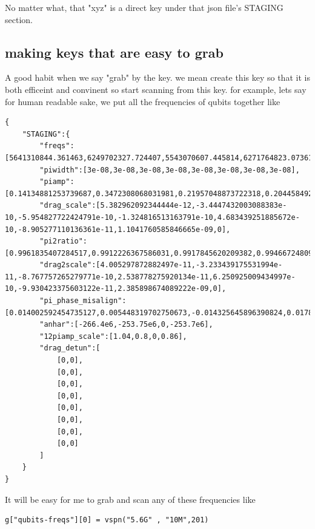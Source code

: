 \documentclass{article}
\begin{document}
No matter what, that "xyz" is a direct key under that json file's STAGING section.

\subsection{making keys that are easy to grab}
A good habit when we say "grab" by the key. we mean create this key so that it is both efficeint and convinent so start scanning from this key.
for example, lets say for human readable sake, we put all the frequencies of qubits together like

\begin{lstlisting}
{
	"STAGING":{
		"freqs":[5641310844.361463,6249702327.724407,5543070607.445814,6271764823.07361,5610179403.893467,6264466031.663818,5621323460.449283,6148057807.784958],
		"piwidth":[3e-08,3e-08,3e-08,3e-08,3e-08,3e-08,3e-08,3e-08],
		"piamp":[0.14134881253739687,0.3472308068031981,0.21957048873722318,0.20445849268925745,0.1370432338043951,0.18301346995335352,0.17112939731078053,0.5],
		"drag_scale":[5.382962092344444e-12,-3.4447432003088383e-10,-5.954827722424791e-10,-1.324816513163791e-10,4.683439251885672e-10,-8.905277110136361e-11,1.1041760585846665e-09,0],
		"pi2ratio":[0.9961835407284517,0.9912226367586031,0.9917845620209382,0.9946672480931976,0.9956273996891115,1.0072530470055292,1.0041945485470531,1],
		"drag2scale":[4.005297872882497e-11,-3.233439175531994e-11,-8.767757265279771e-10,2.538778275920134e-11,6.250925009434997e-10,-9.930423375603122e-11,2.385898674089222e-09,0],
		"pi_phase_misalign":[0.014002592454735127,0.005448319702750673,-0.014325645896390824,0.017884424793861587,0.0018187844002523453,-0.041835706582785154,0.060822719261248825,0],
		"anhar":[-266.4e6,-253.75e6,0,-253.7e6],
		"12piamp_scale":[1.04,0.8,0,0.86],
		"drag_detun":[
			[0,0],
			[0,0],
			[0,0],
			[0,0],
			[0,0],
			[0,0],
			[0,0],
			[0,0]
		]
	}
}

\end{lstlisting}

It will be easy for me to grab and scan any of these frequencies like

\begin{lstlisting}
g["qubits-freqs"][0] = vspn("5.6G" , "10M",201)
\end{lstlisting}
\end{document}
